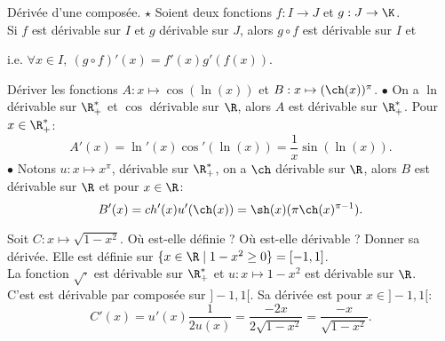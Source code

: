 \documentclass[11pt]{article}
\begin{document}
\begin{thm}{Dérivée d'une composée. $\star$}{}
    Soient deux fonctions $f:I\to J$ et $g:J\to\K$.\\
    Si $f$ est dérivable sur $I$ et $g$ dérivable sur $J$, alors $g\circ f$ est dérivable sur $I$ et
    \begin{center}
         \quad i.e. \quad $\forall x \in I, ~ (g\circ f)'(x)=f'(x)g'(f(x))$.
    \end{center}
\end{thm}

\begin{ex}{}{}
    Dériver les fonctions $A:x\mapsto\cos(\ln(x))$ et $B:x\mapsto(\ch(x))^{\pi}$.
    \tcblower
    $\bullet$ On a $\ln$ dérivable sur $\R_+^*$ et $\cos$ dérivable sur $\R$, alors $A$ est dérivable sur $\R_+^*$. Pour $x\in\R_+^*$:
    \begin{equation*}
        A'(x)=\ln'(x)\cos'(\ln(x))=\frac{1}{x}\sin(\ln(x)).
    \end{equation*}
    $\bullet$ Notons $u:x\mapsto x^\pi$, dérivable sur $\R_+^*$, on a $\ch$ dérivable sur $\R$, alors $B$ est dérivable sur $\R$ et pour $x\in\R$:
    \begin{equation*}
        B'(x)=\\ch'(x)u'(\ch(x))=\sh(x)(\pi\ch(x)^{\pi-1}).
    \end{equation*}
\end{ex}

\pagebreak

\begin{ex}{}{}
    Soit $C:x\mapsto\sqrt{1-x^2}$. Où est-elle définie ? Où est-elle dérivable ? Donner sa dérivée.
    \tcblower
    Elle est définie sur $\{x\in\R\mid 1-x^2\geq0\}=[-1,1]$.\\
    La fonction $\sqrt{\cdot}$ est dérivable sur $\R_+^*$ et $u : x \mapsto 1-x^2$ est dérivable sur $\R$.\\
    C'est est dérivable par composée sur $]-1,1[$. Sa dérivée est pour $x\in]-1,1[$:
    \begin{equation*}
        C'(x)=u'(x)\frac{1}{2u(x)}=\frac{-2x}{2\sqrt{1-x^2}}=\frac{-x}{\sqrt{1-x^2}}.
    \end{equation*} 
\end{ex}
\end{document}
